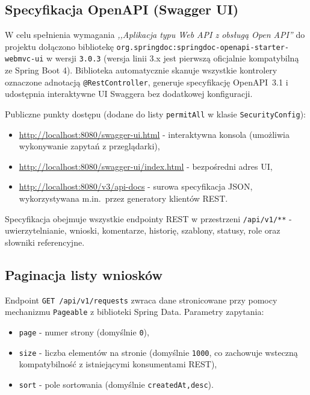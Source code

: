 \documentclass[12pt,a4paper]{article}
\begin{document}
\subsection{Specyfikacja OpenAPI (Swagger UI)}
W celu spełnienia wymagania \emph{,,Aplikacja typu Web API z obsługą Open API''}
do projektu dołączono bibliotekę
\texttt{org.springdoc:springdoc-openapi-starter-webmvc-ui} w wersji \texttt{3.0.3}
(wersja linii 3.x jest pierwszą oficjalnie kompatybilną ze Spring Boot 4).
Biblioteka automatycznie skanuje wszystkie kontrolery oznaczone adnotacją
\texttt{@RestController}, generuje specyfikację OpenAPI~3.1 i udostępnia
interaktywne UI Swaggera bez dodatkowej konfiguracji.

Publiczne punkty dostępu (dodane do listy \texttt{permitAll} w klasie
\texttt{SecurityConfig}):
\begin{itemize}[leftmargin=*]
  \item \url{http://localhost:8080/swagger-ui.html} - interaktywna konsola
        (umożliwia wykonywanie zapytań z przeglądarki),
  \item \url{http://localhost:8080/swagger-ui/index.html} - bezpośredni adres UI,
  \item \url{http://localhost:8080/v3/api-docs} - surowa specyfikacja JSON,
        wykorzystywana m.in.\ przez generatory klientów REST.
\end{itemize}

Specyfikacja obejmuje wszystkie endpointy REST w przestrzeni
\texttt{/api/v1/**} - uwierzytelnianie, wnioski, komentarze, historię,
szablony, statusy, role oraz słowniki referencyjne.

\subsection{Paginacja listy wniosków}
Endpoint \texttt{GET /api/v1/requests} zwraca dane stronicowane przy pomocy
mechanizmu \texttt{Pageable} z biblioteki Spring Data. Parametry zapytania:

\begin{itemize}[leftmargin=*]
  \item \texttt{page} - numer strony (domyślnie \texttt{0}),
  \item \texttt{size} - liczba elementów na stronie (domyślnie \texttt{1000},
        co zachowuje wsteczną kompatybilność z istniejącymi konsumentami REST),
  \item \texttt{sort} - pole sortowania (domyślnie \texttt{createdAt,desc}).
\end{itemize}
\end{document}
